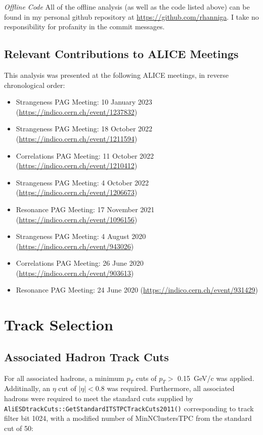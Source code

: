 \documentclass[ALICE,manyauthors]{ALICE_analysis_notes}
\begin{document}
\textit{Offline Code}
All of the offline analysis (as well as the code listed above) can be found in my personal github repository at \url{https://github.com/rhanniga}. I take no responsibility for profanity in the commit messages.

\subsection{Relevant Contributions to ALICE Meetings}
This analysis was presented at the following ALICE meetings, in reverse chronological order:

\begin{itemize}
\item Strangeness PAG Meeting: 10 January 2023 (\url{https://indico.cern.ch/event/1237832})
\item Strangeness PAG Meeting: 18 October 2022 (\url{https://indico.cern.ch/event/1211594})
\item Correlations PAG Meeting: 11 October 2022 (\url{https://indico.cern.ch/event/1210412})
\item Strangeness PAG Meeting: 4 October 2022 (\url{https://indico.cern.ch/event/1206673})
\item Resonance PAG Meeting: 17 November 2021 (\url{https://indico.cern.ch/event/1096156})
\item Strangeness PAG Meeting: 4 August 2020 (\url{https://indico.cern.ch/event/943026})
\item Correlations PAG Meeting: 26 June 2020 (\url{https://indico.cern.ch/event/903613})
\item Resonance PAG Meeting: 24 June 2020 (\url{https://indico.cern.ch/event/931429})
\end{itemize}

\section{Track Selection}

\subsection{Associated Hadron Track Cuts}
\label{assoccuts}
For all associated hadrons, a minimum $p_{T}$ cuts of $p_{T} >$ \SI{0.15}{GeV/c} was applied.  Additinally, an $\eta$ cut of $|{\eta}| < 0.8$ was required. Furthermore, all associated hadrons were required to meet the standard cuts supplied by \texttt{AliESDtrackCuts::GetStandardITSTPCTrackCuts2011()} corresponding to track filter bit 1024, with a modified number of MinNClustersTPC from the standard cut of 50:
\end{document}
